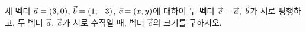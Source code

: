 세 벡터 $\vec{a}=(3{,}\mkern3mu\mathopen{}0)$, $\vec{b}=(1{,}\mkern3mu\mathopen{}-3)$, $\vec{c}=(x{,}\mkern3mu\mathopen{}y)$에 대하여 두 벡터 $\vec{c}-\vec{a}$, $\vec{b}$가 서로 평행하고, 두 벡터 $\vec{a}$, $\vec{c}$가 서로 수직일 때, 벡터 $\vec{c}$의 크기를 구하시오.
